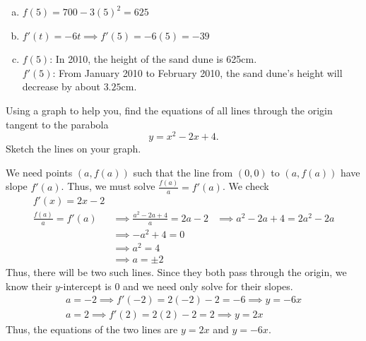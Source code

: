 \documentclass[11pt]{exam}
\begin{document}
\begin{questions}
    \begin{solution}
      \begin{enumerate}[(a)]
      \item \(f(5) = 700-3(5)^2 = 625\)
      \item \(f'(t) = -6t \implies f'(5) = -6(5) = -39\)
      \item \(f(5)\): In 2010, the height of the sand dune is 625cm.\\
        \(f'(5)\): From January 2010 to February 2010, the sand dune's
        height will decrease by about \(3.25\)cm.
      \end{enumerate}
    \end{solution}
  \question Using a graph to help you, find the equations of all lines through the origin tangent to the parabola $$y=x^2-2x+4.$$  Sketch the lines on your graph.
    \begin{solution}
     We need points \((a,f(a))\) such that the line from \((0,0)\) to
     \((a,f(a))\) have slope \(f'(a)\). Thus, we must solve
     \(\frac{f(a)}{a} = f'(a)\). We check
     \begin{align*}
       f'(x) = 2x-2\\
       \frac{f(a)}{a} = f'(a)
       & \implies \frac{a^2-2a+4}{a} = 2a-2 
       & \implies a^2-2a+4 = 2a^2-2a\\
       & \implies -a^2+4 = 0 \\
       & \implies a^2 = 4 \\
       & \implies a = \pm 2
     \end{align*}
     Thus, there will be two such lines. Since they both pass through
     the origin, we know their \(y\)-intercept is \(0\) and we need
     only solve for their slopes.
     \begin{align*}
       a = -2 \implies f'(-2) = 2(-2)-2 = -6 \implies y = -6x\\
       a = 2 \implies f'(2) = 2(2) -2 = 2 \implies y = 2x
     \end{align*}
     Thus, the equations of the two lines are \(y=2x\) and \(y=-6x\).
     \begin{center}

\end{center}
\end{solution}
\end{questions}
\end{document}

